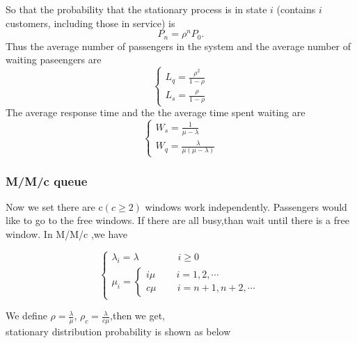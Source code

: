 \documentclass{mcmthesis}
\begin{document}
			So that the probability that the stationary process is in state ${i}$ (contains ${i}$ customers, including those in service) is
			\begin{equation}
			 	P_n = \rho ^n P_0.
			\end{equation}
			Thus the average number of passengers in the system and the average number of waiting paseengers are
				\begin{equation}    
					\left  \{
       						\begin{array}{lr}
			 				L_q = \frac {\rho ^2}{1-\rho}\\
							L_s = \frac{\rho}{1 - \rho}
  					      \end{array}
					\right.
				\end{equation}
			The average response time and the the average time spent waiting are
				\begin{equation}    
					\left  \{
       						\begin{array}{lr}
       							W_s = \frac{1}{\mu - \lambda}\\
       							W_q = \frac{\lambda}{\mu (\mu - \lambda)}
  					      \end{array}
					\right.
				\end{equation}

\subsubsection{M/M/c queue }
Now we set there are c$(c\geqslant 2)$ windows work independently. Passengers would like  to go to the free windows. If there are all busy,than wait until there is a free window.
In M/M/c ,we have 
 

\begin{equation}    
\left  \{
       \begin{array}{lr}
         \lambda_i=\lambda  \qquad \qquad i\geqslant 0\\
           \mu_i=\left  \{
       \begin{array}{lr}
         i\mu  \qquad\, i=1,2,\cdots\\
            c\mu\qquad\, i=n+1,n+2,\cdots
        \end{array}
\right.
        \end{array}
\right.
\end{equation}

We define $\rho=\frac{\lambda}{\mu}$, $\rho_c=\frac{\lambda}{c\mu}$,then we get,
\\stationary distribution probability is shown as below
\end{document}
